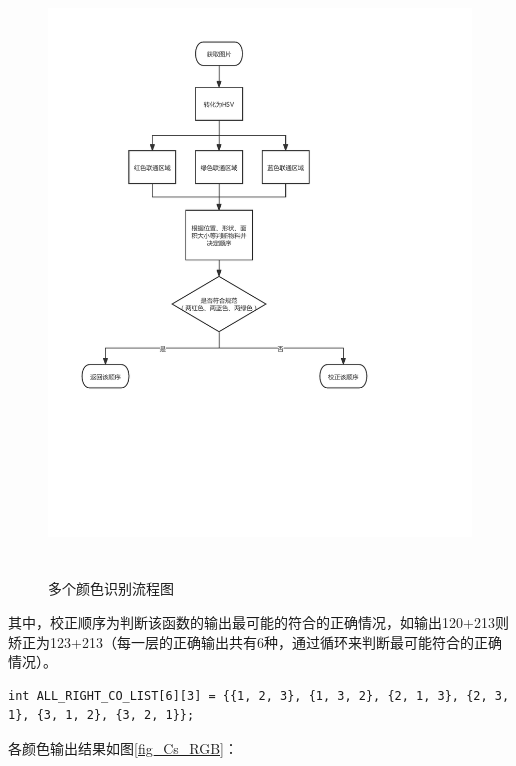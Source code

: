 \documentclass[a4paper,11pt,UTF8]{ctexart}
\begin{document}
\begin{figure}[htbp]
  \centering
  \includegraphics[height=16cm]{多个颜色.pdf}
  \caption{多个颜色识别流程图}\label{fig_Multi}
\end{figure}

其中，校正顺序为判断该函数的输出最可能的符合的正确情况，如输出120+213则矫正为123+213（每一层的正确输出共有6种，通过循环来判断最可能符合的正确情况）。
\begin{lstlisting}[caption={所有可能的正确情况},captionpos=b]
int ALL_RIGHT_CO_LIST[6][3] = {{1, 2, 3}, {1, 3, 2}, {2, 1, 3}, {2, 3, 1}, {3, 1, 2}, {3, 2, 1}};
\end{lstlisting}

各颜色输出结果如图\ref{fig_Cs_RGB}：
\end{document}
